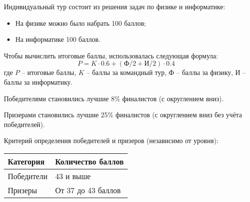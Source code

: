 Индивидуальный тур состоит из решения задач по физике и информатике:
\begin{itemize}
    \item На физике можно было набрать 100 баллов;
    \item На информатике 100 баллов.
\end{itemize}

Чтобы вычислить итоговые баллы, использовалась следующая формула:
$$P = K \cdot 0.6 + (\text{Ф}/2+\text{И}/2) \cdot 0.4$$
где $P$ – итоговые баллы, $K$ – баллы за командный тур, $\text{Ф}$ – баллы за физику, $\text{И}$ –
баллы за информатику.

Победителями становились лучшие 8\% финалистов (с округлением вниз).

Призерами становились лучшие 25\% финалистов (с округлением вниз без учёта победителей).

Критерий определения победителей и призеров (независимо от уровня):
\begin{center}
    \begin{tabular}{|l|l|}
        \hline
        Категория& Количество баллов\\
        \hline
        Победители&43 и выше\\
        \hline
        Призеры&От 37 до 43 баллов \\
        \hline
    \end{tabular}
\end{center}

